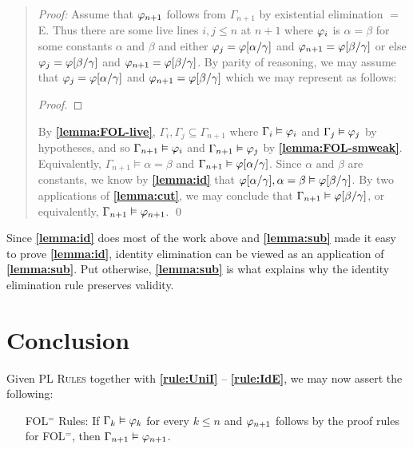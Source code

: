 \begin{quote} 
  \textit{Proof:} Assume that $\varphi_{n+1}$ follows from $\Gamma_{n+1}$ by existential elimination $=$E.
  Thus there are some live lines $i,j\leq n$ at $n+1$ where $\varphi_i$ is $\alpha=\beta$ for some constants $\alpha$ and $\beta$ and either $\varphi_j=\varphi[\alpha/\gamma]$ and $\varphi_{n+1}=\varphi[\beta/\gamma]$ or else $\varphi_j=\varphi[\beta/\gamma]$ and $\varphi_{n+1}=\varphi[\beta/\gamma]$.
  By parity of reasoning, we may assume that $\varphi_j=\varphi[\alpha/\gamma]$ and $\varphi_{n+1}=\varphi[\beta/\gamma]$ which we may represent as follows:

  \begin{proof}
     
  \end{proof}

  By \textbf{\ref{lemma:FOL-live}}, $\Gamma_i,\Gamma_j\subseteq \Gamma_{n+1}$ where $\Gamma_i\vDash\varphi_i$ and $\Gamma_j\vDash\varphi_j$ by hypotheses, and so $\Gamma_{n+1} \vDash \varphi_i$ and $\Gamma_{n+1} \vDash \varphi_j$ by \textbf{\ref{lemma:FOL-smweak}}.
  Equivalently, $\Gamma_{n+1} \vDash \alpha = \beta$ and $\Gamma_{n+1} \vDash \varphi[\alpha/\gamma]$.
  Since $\alpha$ and $\beta$ are constants, we know by \textbf{\ref{lemma:id}} that $\varphi[\alpha/\gamma], \alpha = \beta \vDash \varphi[\beta/\gamma]$.
  By two applications of \textbf{\ref{lemma:cut}}, we may conclude that $\Gamma_{n+1}\vDash\varphi[\beta/\gamma]$, or equivalently, $\Gamma_{n+1}\vDash\varphi_{n+1}$.
  \qed
\end{quote}


Since \textbf{\ref{lemma:id}} does most of the work above and \textbf{\ref{lemma:sub}} made it easy to prove \textbf{\ref{lemma:id}}, identity elimination can be viewed as an application of \textbf{\ref{lemma:sub}}.
Put otherwise, \textbf{\ref{lemma:sub}} is what explains why the identity elimination rule preserves validity.


\section{Conclusion}%
  \label{sec:Conclusion}

Given \textsc{PL Rules} together with \textbf{\ref{rule:UniI}} -- \textbf{\ref{rule:IdE}}, we may now assert the following:

\begin{enumerate}[leftmargin=1.3in]
  \item[\sc FOL$^=$ Rules:] If $\Gamma_k \vDash \varphi_k$ for every $k\leq n$ and $\varphi_{n+1}$ follows by the proof rules for FOL$^=$, then $\Gamma_{n+1} \vDash \varphi_{n+1}$.
\end{enumerate}

